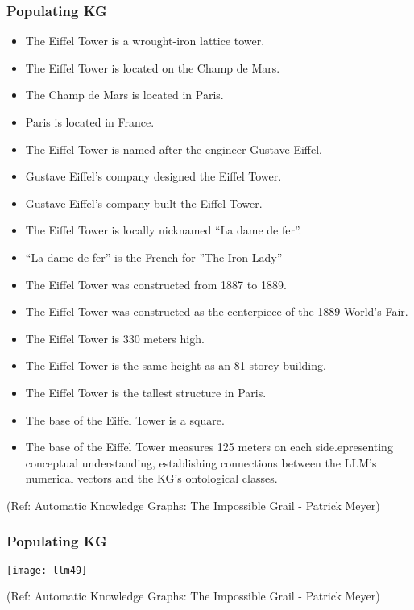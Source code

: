 \begin{frame}[fragile]\frametitle{Populating KG}

\begin{itemize}
\item The Eiffel Tower is a wrought-iron lattice tower.
\item The Eiffel Tower is located on the Champ de Mars.
\item The Champ de Mars is located in Paris.
\item Paris is located in France.
\item The Eiffel Tower is named after the engineer Gustave Eiffel.
\item Gustave Eiffel’s company designed the Eiffel Tower.
\item Gustave Eiffel’s company built the Eiffel Tower.
\item The Eiffel Tower is locally nicknamed “La dame de fer”.
\item “La dame de fer” is the French for ”The Iron Lady”
\item The Eiffel Tower was constructed from 1887 to 1889.
\item The Eiffel Tower was constructed as the centerpiece of the 1889 World’s Fair.
\item The Eiffel Tower is 330 meters high.
\item The Eiffel Tower is the same height as an 81-storey building.
\item The Eiffel Tower is the tallest structure in Paris.
\item The base of the Eiffel Tower is a square.
\item The base of the Eiffel Tower measures 125 meters on each side.epresenting conceptual understanding, establishing connections between the LLM's numerical vectors and the KG's ontological classes.
\end{itemize}

{\tiny (Ref: Automatic Knowledge Graphs: The Impossible Grail - Patrick Meyer)}

\end{frame}

\begin{frame}[fragile]\frametitle{Populating KG}

\begin{center}
\texttt{[image: llm49]}
\end{center}

{\tiny (Ref: Automatic Knowledge Graphs: The Impossible Grail - Patrick Meyer)}

\end{frame}

